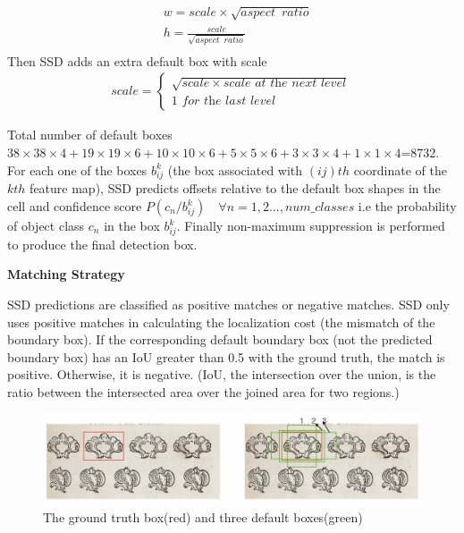 \documentclass[12pt]{article}
\begin{document}
\begin{align*}
    & w=scale \times \sqrt{aspect\enspace ratio}\\
    & h=\frac{scale}{\sqrt{aspect\enspace ratio}}\\
\end{align*}
Then SSD adds an extra default box with scale\\
\begin{align*}
    scale=\begin{cases}
    \sqrt{scale\times \textit{scale at the next level}}\\
    1 \textit{ for the last level}
    \end{cases}
\end{align*}

Total number of default boxes $38\times 38 \times 4+19 \times 19 \times 6+10\times 10\times6+5\times5\times6+3\times3\times4+1\times1\times4$=8732.
For each one of the boxes $b_{ij}^{k}$ (the box associated with $(ij)th$ coordinate of the $kth$ feature map), SSD predicts offsets relative to the default box shapes in the cell and confidence score $P(c_{n}/b_{ij}^{k}) \quad \forall n=1,2...,num\_classes$ i.e the probability of object class $c_{n}$ in the box $b_{ij}^{k}$. Finally non-maximum suppression is performed to produce the final detection box.\\



\begin{flushleft}
\textbf{Matching Strategy}
\end{flushleft}
SSD predictions are classified as positive matches or negative matches. SSD only uses positive matches in calculating the localization cost (the mismatch of the boundary box). If the corresponding default boundary box (not the predicted boundary box) has an IoU greater than 0.5 with the ground truth, the match is positive. Otherwise, it is negative. (IoU, the intersection over the union, is the ratio between the intersected area over the joined area for two regions.)

\begin{figure}[h]
    \centering
    \includegraphics[scale=0.58]{ssd_default_ground.png}
    \caption{The ground truth box(red) and three default boxes(green)}
    \label{fig:mesh6}
\end{figure}
\end{document}
